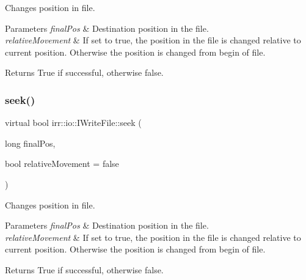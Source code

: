 Changes position in file. 


\begin{DoxyParams}{Parameters}
{\em final\+Pos} & Destination position in the file. \\
\hline
{\em relative\+Movement} & If set to true, the position in the file is changed relative to current position. Otherwise the position is changed from begin of file. \\
\hline
\end{DoxyParams}
\begin{DoxyReturn}{Returns}
True if successful, otherwise false. 
\end{DoxyReturn}
\mbox{\label{classirr_1_1io_1_1IWriteFile_ad68289024b2a2079fce20ca9b95c9519}} 
\subsubsection{\texorpdfstring{seek()}{seek()}\hspace{0.1cm}{\footnotesize\ttfamily [2/2]}}
{\footnotesize\ttfamily virtual bool irr\+::io\+::\+I\+Write\+File\+::seek (\begin{DoxyParamCaption}\item[{long}]{final\+Pos,  }\item[{bool}]{relative\+Movement = {\ttfamily false} }\end{DoxyParamCaption})\hspace{0.3cm}{\ttfamily [pure virtual]}}



Changes position in file. 


\begin{DoxyParams}{Parameters}
{\em final\+Pos} & Destination position in the file. \\
\hline
{\em relative\+Movement} & If set to true, the position in the file is changed relative to current position. Otherwise the position is changed from begin of file. \\
\hline
\end{DoxyParams}
\begin{DoxyReturn}{Returns}
True if successful, otherwise false. 
\end{DoxyReturn}
\mbox{\label{classirr_1_1io_1_1IWriteFile_a32ce2fb186c4a21fcf3c85adb13c7c77}} 
